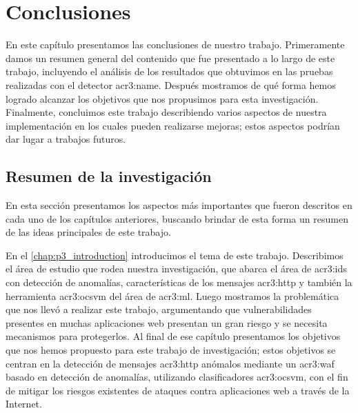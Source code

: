 \renewcommand{\newCommandChapterTitle}{Conclusiones}
\chapter{\newCommandChapterTitle}
\markright{\hfill \thechapter. \newCommandChapterTitle}
\label{chap:p3_conclusions}


En este capítulo presentamos las conclusiones de nuestro trabajo.
Primeramente damos un resumen general del contenido que fue presentado
a lo largo de este trabajo, incluyendo el análisis de los resultados
que obtuvimos en las pruebas realizadas con el detector \gls{acr3:name}.
Después mostramos de qué forma hemos logrado alcanzar los objetivos que
nos propusimos para esta investigación. Finalmente, concluimos este
trabajo describiendo varios aspectos de nuestra implementación en los
cuales pueden realizarse mejoras; estos aspectos podrían dar lugar a
trabajos futuros.


\section{Resumen de la investigación}

En esta sección presentamos los aspectos más importantes que fueron
descritos en cada uno de los capítulos anteriores, buscando brindar de
esta forma un resumen de las ideas principales de este trabajo.

En el \autoref{chap:p3_introduction} introducimos el tema de este trabajo.
Describimos el área de estudio que rodea nuestra investigación, que abarca
el área de \gls{acr3:ids} con detección de anomalías, características
de los mensajes \gls{acr3:http} y también la herramienta \gls{acr3:ocsvm}
del área de \gls{acr3:ml}. Luego mostramos la problemática que nos llevó
a realizar este trabajo, argumentando que vulnerabilidades presentes en
muchas aplicaciones web presentan un gran riesgo y se necesita mecanismos
para protegerlos. Al final de ese capítulo presentamos los objetivos que
nos hemos propuesto para este trabajo de investigación; estos objetivos
se centran en la detección de mensajes \gls{acr3:http} anómalos mediante
un \gls{acr3:waf} basado en detección de anomalías, utilizando clasificadores
\gls{acr3:ocsvm}, con el fin de mitigar los riesgos existentes de ataques
contra aplicaciones web a través de la Internet.

